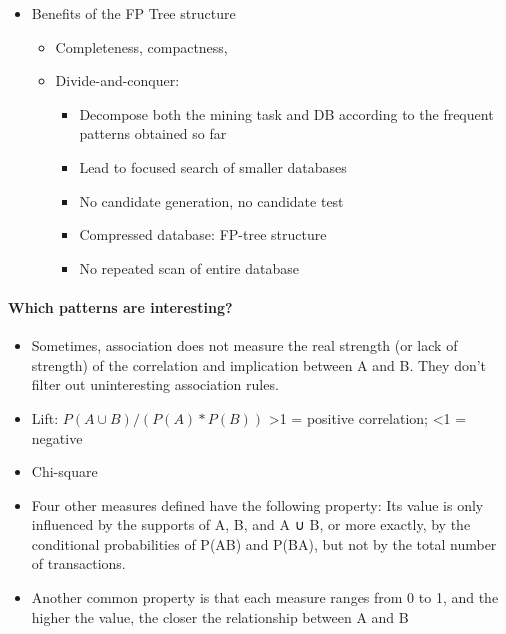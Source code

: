 \documentclass[11pt]{article}
\providecommand{\tightlist}{%
      \setlength{\itemsep}{0pt}\setlength{\parskip}{0pt}}
\begin{document}
    \begin{itemize}
\tightlist
\item
  Benefits of the FP Tree structure

  \begin{itemize}
  \tightlist
  \item
    Completeness, compactness,
  \item
    Divide-and-conquer:

    \begin{itemize}
    \tightlist
    \item
      Decompose both the mining task and DB according to the frequent
      patterns obtained so far
    \item
      Lead to focused search of smaller databases
    \item
      No candidate generation, no candidate test
    \item
      Compressed database: FP-tree structure
    \item
      No repeated scan of entire database
    \end{itemize}
  \end{itemize}
\end{itemize}

    \paragraph{Which patterns are
interesting?}\label{which-patterns-are-interesting}

    \begin{itemize}
\tightlist
\item
  Sometimes, association does not measure the real strength (or lack of
  strength) of the correlation and implication between A and B. They
  don't filter out uninteresting association rules.
\end{itemize}

    \begin{itemize}
\tightlist
\item
  Lift: \(P(A \cup B) / (P(A) * P(B))\) \textgreater{}1 = positive
  correlation; \textless{}1 = negative
\item
  Chi-square
\end{itemize}

    \begin{itemize}
\tightlist
\item
  Four other measures defined have the following property: Its value is
  only influenced by the supports of A, B, and A ∪ B, or more exactly,
  by the conditional probabilities of P(A\textbar{}B) and
  P(B\textbar{}A), but not by the total number of transactions.
\item
  Another common property is that each measure ranges from 0 to 1, and
  the higher the value, the closer the relationship between A and B
\end{itemize}
\end{document}
